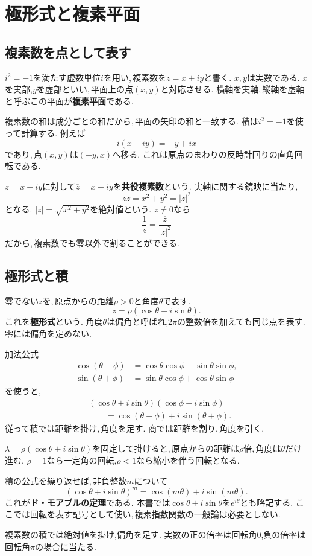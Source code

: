 \section{極形式と複素平面}\label{節：極形式と複素平面}
\subsection{複素数を点として表す}

$i^2=-1$を満たす虚数単位$i$を用い,\,複素数を$z=x+iy$と書く.
$x,y$は実数である.
$x$を実部,$y$を虚部といい,\,平面上の点$(x,y)$と対応させる.
横軸を実軸,\,縦軸を虚軸と呼ぶこの平面が\textbf{複素平面}である.

複素数の和は成分ごとの和だから,\,平面の矢印の和と一致する.
積は$i^2=-1$を使って計算する.
例えば
\[
 i(x+iy)=-y+ix
\]
であり,\,点$(x,y)$は$(-y,x)$へ移る.
これは原点のまわりの反時計回りの直角回転である.

$z=x+iy$に対して$\overline z=x-iy$を\textbf{共役複素数}という.
実軸に関する鏡映に当たり,
\[
 z\overline z=x^2+y^2=|z|^2
\]
となる. $|z|=\sqrt{x^2+y^2}$を絶対値という.
$z\ne0$なら
\[
 \frac1z=\frac{\overline z}{|z|^2}
\]
だから,\,複素数でも零以外で割ることができる.

\subsection{極形式と積}

零でない$z$を,\,原点からの距離$\rho>0$と角度$\theta$で表す.
\[
 z=\rho(\cos\theta+i\sin\theta).
\]
これを\textbf{極形式}という.
角度$\theta$は偏角と呼ばれ,$2\pi$の整数倍を加えても同じ点を表す.
零には偏角を定めない.

加法公式
\[
 \begin{aligned}
 \cos(\theta+\phi)&=\cos\theta\cos\phi-\sin\theta\sin\phi,\\
 \sin(\theta+\phi)&=\sin\theta\cos\phi+\cos\theta\sin\phi
 \end{aligned}
\]
を使うと,
\[
 \begin{aligned}
 &(\cos\theta+i\sin\theta)(\cos\phi+i\sin\phi)\\
 &\qquad=\cos(\theta+\phi)+i\sin(\theta+\phi).
 \end{aligned}
\]
従って積では距離を掛け,\,角度を足す.
商では距離を割り,\,角度を引く.

$\lambda=\rho(\cos\theta+i\sin\theta)$を固定して掛けると,\,原点からの距離は$\rho$倍,\,角度は$\theta$だけ進む.
$\rho=1$なら一定角の回転,$\rho<1$なら縮小を伴う回転となる.
\NewFigRotation

積の公式を繰り返せば,\,非負整数$m$について
\[
 (\cos\theta+i\sin\theta)^m
 =\cos(m\theta)+i\sin(m\theta).
\]
これが\textbf{ド・モアブルの定理}である.
本書では$\cos\theta+i\sin\theta$を$e^{i\theta}$とも略記する.
ここでは回転を表す記号として使い,\,複素指数関数の一般論は必要としない.


\begin{bookpoint}
複素数の積では絶対値を掛け,偏角を足す.
実数の正の倍率は回転角0,負の倍率は回転角$\pi$の場合に当たる.
\end{bookpoint}
